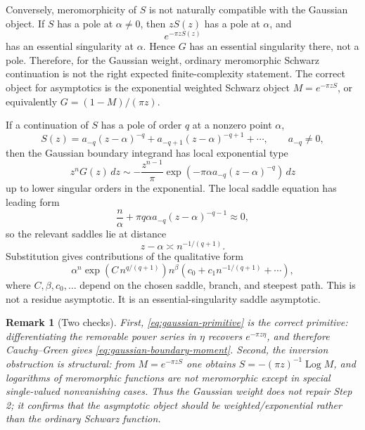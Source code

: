 \documentclass[11pt]{article}
\newtheorem{remark}[theorem]{Remark}
\newcommand{\dd}{\,d}
\newcommand{\1}{\mathbf 1}
\newcommand{\Log}{\operatorname{Log}}
\begin{document}
Conversely, meromorphicity of \(S\) is not naturally compatible with the Gaussian object.
If \(S\) has a pole at \(\alpha\ne0\), then \(zS(z)\) has a pole at \(\alpha\), and
\[
  e^{-\pi zS(z)}
\]
has an essential singularity at \(\alpha\). Hence \(G\) has an essential singularity there,
not a pole. Therefore, for the Gaussian weight, ordinary meromorphic Schwarz continuation
is not the right expected finite-complexity statement. The correct object for asymptotics
is the exponential weighted Schwarz object \(M=e^{-\pi zS}\), or equivalently
\(G=(1-M)/(\pi z)\).

If a continuation of \(S\) has a pole of order \(q\) at a nonzero point \(\alpha\),
\[
  S(z)=a_{-q}(z-\alpha)^{-q}+a_{-q+1}(z-\alpha)^{-q+1}+\cdots,
  \qquad a_{-q}\ne0,
\]
then the Gaussian boundary integrand has local exponential type
\[
  z^nG(z)\dd z
  \sim
  -\frac{z^{n-1}}{\pi}
  \exp\!\left(
    -\pi\alpha a_{-q}(z-\alpha)^{-q}
  \right)\dd z
\]
up to lower singular orders in the exponential. The local saddle equation has leading
form
\begin{equation}\label{eq:gaussian-pole-saddles}
  \frac{n}{\alpha}
  +
  \pi q\alpha a_{-q}(z-\alpha)^{-q-1}
  \approx0,
\end{equation}
so the relevant saddles lie at distance
\begin{equation}\label{eq:gaussian-pole-scale}
  z-\alpha
  \asymp
  n^{-1/(q+1)}.
\end{equation}
Substitution gives contributions of the qualitative form
\begin{equation}\label{eq:gaussian-pole-asymp}
  \alpha^n
  \exp\!\left(C\,n^{q/(q+1)}\right)
  n^\beta
  \left(c_0+c_1 n^{-1/(q+1)}+\cdots\right),
\end{equation}
where \(C,\beta,c_0,\dots\) depend on the chosen saddle, branch, and steepest path. This
is not a residue asymptotic. It is an essential-singularity saddle asymptotic.

\begin{remark}[Two checks]
First, \eqref{eq:gaussian-primitive} is the correct primitive: differentiating the
removable power series in \(\eta\) recovers \(e^{-\pi z\eta}\), and therefore
Cauchy--Green gives \eqref{eq:gaussian-boundary-moment}. Second, the inversion obstruction
is structural: from \(M=e^{-\pi zS}\) one obtains \(S=-(\pi z)^{-1}\Log M\), and logarithms
of meromorphic functions are not meromorphic except in special single-valued nonvanishing
cases. Thus the Gaussian weight does not repair Step 2; it confirms that the asymptotic
object should be weighted/exponential rather than the ordinary Schwarz function.
\end{remark}
\end{document}
